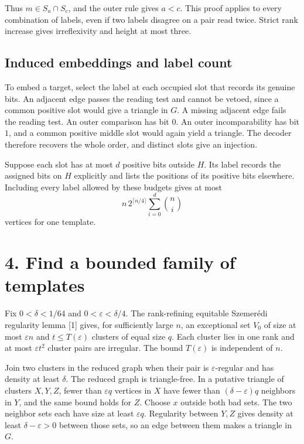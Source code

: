\documentclass[11pt,a4paper]{article}
\begin{document}
Thus \(m\in S_a\cap S_c\), and the outer rule gives \(a<c\). This proof
applies to every combination of labels, even if two labels disagree on a
pair read twice. Strict rank increase gives irreflexivity and height at
most three.

\subsection{Induced embeddings and label
count}\label{induced-embeddings-and-label-count}

To embed a target, select the label at each occupied slot that records
its genuine bits. An adjacent edge passes the reading test and cannot be
vetoed, since a common positive slot would give a triangle in \(G\). A
missing adjacent edge fails the reading test. An outer comparison has
bit \(0\). An outer incomparability has bit \(1\), and a common positive
middle slot would again yield a triangle. The decoder therefore recovers
the whole order, and distinct slots give an injection.

Suppose each slot has at most \(d\) positive bits outside \(H\). Its
label records the assigned bits on \(H\) explicitly and lists the
positions of its positive bits elsewhere. Including every label allowed
by these budgets gives at most \[
n\,2^{\lceil n/4\rceil}\sum_{i=0}^{d}\binom ni
\] vertices for one template.

\newpage

\section{4. Find a bounded family of
templates}\label{find-a-bounded-family-of-templates}

Fix \(0<\delta<1/64\) and \(0<\varepsilon<\delta/4\). The rank-refining
equitable Szemerédi regularity lemma {[}1{]} gives, for sufficiently
large \(n\), an exceptional set \(V_0\) of size at most
\(\varepsilon n\) and \(t\le T(\varepsilon)\) clusters of equal size
\(q\). Each cluster lies in one rank and at most \(\varepsilon t^2\)
cluster pairs are irregular. The bound \(T(\varepsilon)\) is independent
of \(n\).

Join two clusters in the reduced graph when their pair is
\(\varepsilon\)-regular and has density at least \(\delta\). The reduced
graph is triangle-free. In a putative triangle of clusters \(X,Y,Z\),
fewer than \(\varepsilon q\) vertices in \(X\) have fewer than
\((\delta-\varepsilon)q\) neighbors in \(Y\), and the same bound holds
for \(Z\). Choose \(x\) outside both bad sets. The two neighbor sets
each have size at least \(\varepsilon q\). Regularity between \(Y,Z\)
gives density at least \(\delta-\varepsilon>0\) between those sets, so
an edge between them makes a triangle in \(G\).
\end{document}
